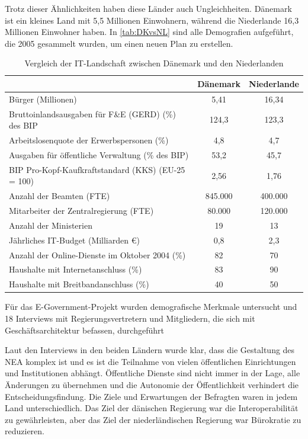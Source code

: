 \documentclass[
	doc,
	a4paper,
	helv
	]{apa6}
\begin{document}
Trotz dieser Ähnlichkeiten haben diese Länder auch Ungleichheiten. Dänemark ist ein kleines Land mit 5,5 Millionen Einwohnern, während die Niederlande 16,3 Millionen Einwohner haben. In \autoref{tab:DKvsNL} sind alle Demografien aufgeführt, die 2005 gesammelt wurden, um einen neuen Plan zu erstellen.
\begin{table}[htbp]
\caption{Vergleich der IT-Landschaft zwischen Dänemark und den Niederlanden \mbox{\autocite{Janssen2007}}}
\begin{center}
\begin{tabularx}{\textwidth}{|X|c|c|}
\hline
& Dänemark & Niederlande \\\hline
Bürger (Millionen) & 5,41 & 16,34 \\\hline
Bruttoinlandsausgaben für F\&E (GERD) (\%) des BIP & 124,3 & 123,3 \\\hline
Arbeitslosenquote der Erwerbspersonen (\%) & 4,8 & 4,7 \\\hline
Ausgaben für öffentliche Verwaltung (\% des BIP) & 53,2 & 45,7 \\\hline
BIP Pro-Kopf-Kaufkraftstandard (KKS) (EU-25 = 100) & 2,56 & 1,76 \\\hline
Anzahl der Beamten (FTE) & 845.000 & 400.000 \\\hline
Mitarbeiter der Zentralregierung (FTE) & 80.000 & 120.000 \\\hline
Anzahl der Ministerien & 19 & 13 \\\hline
Jährliches IT-Budget (Milliarden \euro) & 0,8 & 2,3 \\\hline
Anzahl der Online-Dienste im Oktober 2004 (\%) & 82 & 70 \\\hline
Haushalte mit Internetanschluss  (\%) & 83 & 90 \\\hline
Haushalte mit Breitbandanschluss  (\%) & 40 & 50 \\\hline
\end{tabularx}
\end{center}
\label{tab:DKvsNL}
\end{table}
Für das E-Government-Projekt wurden demografische Merkmale untersucht und 18 Interviews mit Regierungsvertretern und Mitgliedern, die sich mit Geschäftsarchitektur befassen, durchgeführt

Laut den Interviews in den beiden Ländern wurde klar, dass die Gestaltung des NEA komplex ist und es ist die Teilnahme von vielen öffentlichen Einrichtungen und Institutionen abhängt. Öffentliche Dienste sind nicht immer in der Lage, alle Änderungen zu übernehmen und die Autonomie der Öffentlichkeit verhindert die Entscheidungsfindung. Die Ziele und Erwartungen der Befragten waren in jedem Land unterschiedlich. Das Ziel der dänischen Regierung war die Interoperabilität zu gewährleisten, aber das Ziel der niederländischen Regierung war Bürokratie zu reduzieren.
\end{document}
